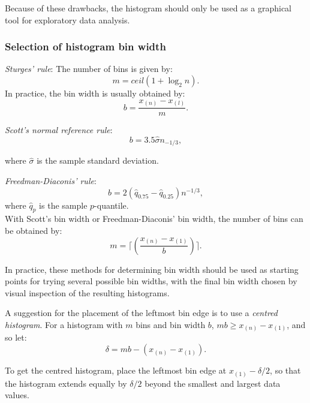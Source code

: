 Because of these drawbacks, the histogram should only be used as a graphical tool for exploratory data analysis.


\subsubsection{Selection of histogram bin width}
\begin{asparaenum}[(a)]
\item	{\it Sturges' rule}: The number of bins is given by:
\begin{equation}
m=ceil(1+\log_2n).
\end{equation}
In practice, the bin width is usually obtained by:
\begin{equation}
b=\frac{x_{(n)}-x_{(l)}}{m}.
\end{equation}
\item	{\it Scott's normal reference rule}:
\begin{equation}
b=3.5\widehat{\sigma}n_{-1/3},
\end{equation}

where $\widehat{\sigma}$ is the sample standard deviation.

\item	{\it Freedman-Diaconis' rule}:
\begin{equation}
b=2(\widehat{q}_{0.75}-\widehat{q}_{0.25})n^{-1/3},
\end{equation}
where $\widehat{q}_p$ is the sample $p$-quantile.\\
With Scott's bin width or Freedman-Diaconis' bin width, the number of bins can be obtained by:
\begin{equation}
m= \lceil \left(\frac{x_{(n)}-x_{(1)}}{b}\right) \rceil.
\end{equation}
\end{asparaenum}

In practice, these methods for determining bin width should be used as starting points for trying several possible bin widths, with the final bin width chosen by visual inspection of the resulting histograms.

A suggestion for the placement of the leftmost bin edge is to use a {\em centred histogram}. For a histogram with $m$ bins and bin width $b$, $mb\geq x_{(n)}-x_{(1)}$, and so let:
\begin{equation}
\delta=mb-(x_{(n)}-x_{(1)}).
\end{equation}

To get the centred histogram, place the leftmost bin edge at $x_{(1)}-\delta/2$, so that the histogram extends equally by $\delta/2$ beyond the smallest and largest data values.
